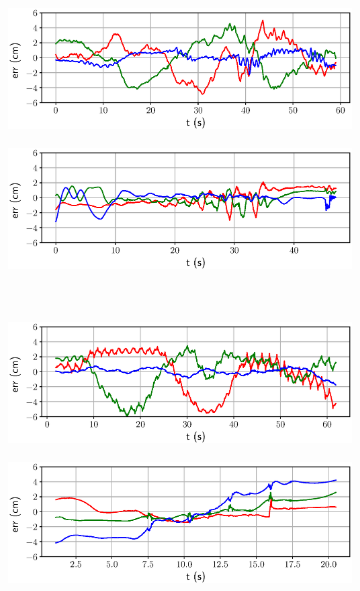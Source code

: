 \begin{figure}
     \centering
     \begin{subfigure}[b]{0.49\textwidth}
         \centering
         \includegraphics[width=\textwidth]{figures/absolute/terr_loop_twice.eps}
     \end{subfigure}
     \hfill
     \begin{subfigure}[b]{0.49\textwidth}
         \centering
         \includegraphics[width=\textwidth]{figures/absolute/terr_stairs1.eps}
     \end{subfigure}
     \\
    \begin{subfigure}[b]{0.49\textwidth}
         \centering
         \includegraphics[width=\textwidth]{figures/absolute/terr_robot1_walking.eps}
     \end{subfigure}
     \hfill
     \begin{subfigure}[b]{0.49\textwidth}
         \centering
         \includegraphics[width=\textwidth]{figures/absolute/terr_descending2.eps}
     \end{subfigure}
     

\end{figure}
